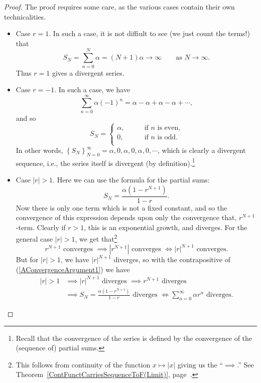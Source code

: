 \begin{proof} The proof requires some care, as the various cases 
contain their own technicalities.  
\begin{itemize}
\item Case $r=1$. In such a case, it is not diffiult to see (we just
      count the terms!) that
$$S_N=\sum_{n=0}^N\alpha=(N+1)\alpha\longrightarrow\infty
       \qquad\text{as }N\to\infty.$$
Thus $r=1$ gives a divergent series.
\item Case $r=-1$. In such a case, we have
$$\sum_{n=0}^\infty\alpha(-1)^n=\alpha-\alpha+\alpha-\alpha+\cdots,$$
and so 
$$S_N=\left\{\begin{array}{rl}
\alpha,&\qquad\text{if }n\text{ is even,}\\
0,&\qquad\text{if }n\text{ is odd.}\\
\end{array}\right.$$
In other words, $\left\{S_N\right\}_{N=0}^\infty=\alpha,0,\alpha,0,\alpha,0,
   \cdots$, which is clearly a divergent sequence, i.e., 
   the series itself is divergent (by definition).\footnote{%
Recall that the convergence of the series is defined by the convergence
of the (sequence of) partial sums.
}
\item Case $|r|>1$. Here we can use the formula for the partial sums:
$$S_N=\frac{\alpha\left(1-r^{N+1}\right)}{1-r}.$$
Now there is only one term which is not a fixed constant, and so
the convergence of this expression depends upon only the
convergence that,  $r^{N+1}$-term.  Clearly if $r>1$, 
this is an exponential growth, and diverges.  For the general case
$|r|>1$, we get that\footnote{%
This follows from
continuity of the function $x\mapsto|x|$ giving us the ``$\implies$.''
See Theorem~\ref{ContFunctCarriesSequenceToF(Limit)},
page~\pageref{ContFunctCarriesSequenceToF(Limit)}.
}
\begin{equation}
r^{N+1}\text{ converges }\implies \left|r^{N+1}\right|\text{ converges }
\iff|r|^{N+1}\text{ converges.}\label{AConvergenceArgument1}\end{equation}
But for $|r|>1$, we have $|r|^{N+1}$ diverges, so with
the contrapositive of (\ref{AConvergenceArgument1}) we have
\begin{align*}
|r|>1&\implies |r|^{N+1}\text{ diverges }\implies
r^{N+1}\text{ diverges } \\
&\implies S_N=\frac{\alpha\left(1-r^{N+1}\right)}{1-r} \text{ diverges }
\iff \sum_{n=0}^\infty\alpha r^n\text{ diverges.}\end{align*}

\end{itemize}
\end{proof}
